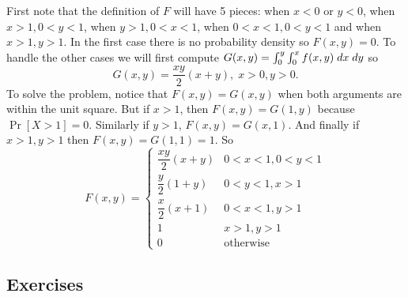 \documentclass[../main.tex]{subfiles}
\begin{document}
\begin{solution}
First note that the definition of $F$ will have 5 pieces: when $x<0$ or $y<0$, when $x>1,0<y<1$,
when $y>1, 0<x<1$, when $0<x<1, 0<y<1$ and when $x>1,y>1$. In the first case there is no probability density so $F(x,y) = 0$. To handle the other cases we will first compute $G(x,y)
 = \int_0^y\int_0^x f(x,y) \;dx \;dy$ so
 $$G(x,y) = \dfrac{xy}{2}(x+y), \; x>0, y>0.$$
 To solve the problem, notice that $F(x,y) = G(x,y)$ when both arguments are within the unit square. But if $x>1$, then $F(x,y) = G(1,y)$ because $\Pr[X>1] = 0$. Similarly if $y>1$,
 $F(x,y) = G(x,1)$. And finally if $x>1,y>1$ then $F(x,y) = G(1,1) = 1$. So
 $$F(x,y) = 
    \begin{cases}
        \dfrac{xy}{2}(x+y) & 0<x<1, 0<y<1 \\[4ex]
        \dfrac{y}{2}(1+y) & 0<y<1, x>1 \\[4ex]
        \dfrac{x}{2}(x+1) & 0<x<1, y>1 \\[4ex]
        1 & x>1, y>1 \\
        0 & \mbox {otherwise}
    \end{cases}$$
\end{solution}
\subsection{Exercises}
\end{document}
